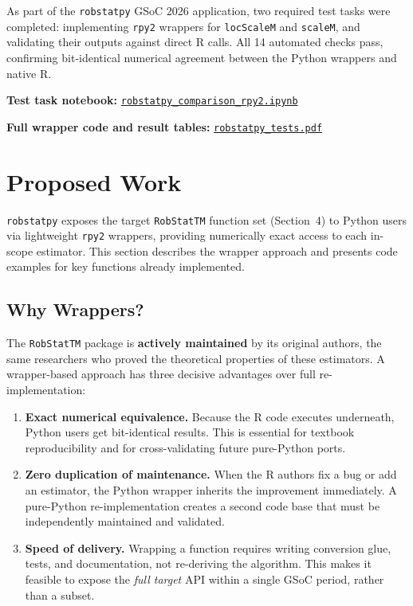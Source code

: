 \documentclass[11pt, a4paper]{article}
\begin{document}
As part of the \texttt{robstatpy} GSoC 2026 application, two required
test tasks were completed: implementing \texttt{rpy2} wrappers for
\texttt{locScaleM} and \texttt{scaleM}, and validating their outputs
against direct R calls. All 14 automated checks pass, confirming
bit-identical numerical agreement between the Python wrappers and
native R.

\noindent\textbf{Test task notebook:}
\href{https://github.com/Aakarsh751/robstattm-pyport-AG-prop/blob/main/robstattm/python/robstatpy\_comparison\_rpy2.ipynb}%
{\texttt{robstatpy\_comparison\_rpy2.ipynb}}

\noindent\textbf{Full wrapper code and result tables:}
\href{https://github.com/Aakarsh751/robstattm-pyport-AG-prop/blob/main/docs/gsoc2026_proposal/robstatpy_tests.pdf}%
{\texttt{robstatpy\_tests.pdf}}

\section{Proposed Work}

\texttt{robstatpy} exposes the target \texttt{RobStatTM} function set
(Section~4) to Python users via lightweight \texttt{rpy2} wrappers, providing
numerically exact access to each in-scope estimator.
This section describes the wrapper approach and presents code examples
for key functions already implemented.

\subsection{Why Wrappers?}

The \texttt{RobStatTM} package is \textbf{actively maintained} by its
original authors, the same researchers who proved the theoretical
properties of these estimators.
A wrapper-based approach has three decisive advantages over full
re-implementation:

\begin{enumerate}[leftmargin=2em]
  \item \textbf{Exact numerical equivalence.}  Because the R code
    executes underneath, Python users get bit-identical results.
    This is essential for textbook reproducibility and for
    cross-validating future pure-Python ports.
  \item \textbf{Zero duplication of maintenance.}  When the R authors
    fix a bug or add an estimator, the Python wrapper inherits the
    improvement immediately.
    A pure-Python re-implementation creates a second code base that
    must be independently maintained and validated.
  \item \textbf{Speed of delivery.}  Wrapping a function requires
    writing conversion glue, tests, and documentation, not
    re-deriving the algorithm.
    This makes it feasible to expose the \emph{full target} API within a
    single GSoC period, rather than a subset.
\end{enumerate}
\end{document}
